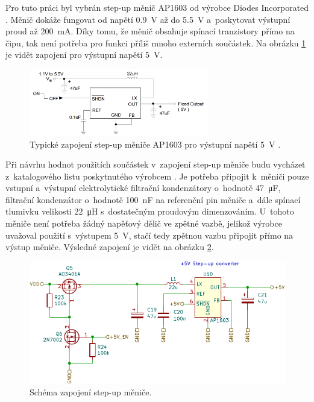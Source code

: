 Pro tuto práci byl vybrán step-up měnič AP1603 od výrobce Diodes Incorporated \cite{dat_AP1603}. Měnič dokáže fungovat od napětí \SI{0.9}{\volt} až do \SI{5.5}{\volt} a~poskytovat výstupní proud až \SI{200}{\milli\ampere}. Díky tomu, že měnič obsahuje spínací tranzistory přímo na čipu, tak není potřeba pro funkci příliš mnoho externích součástek. Na obrázku \ref{fig_schematic-AP1603} je vidět zapojení pro výstupní napětí \SI{5}{\volt}. 

\begin{figure}[h]
    \centering
    \includegraphics[width=0.7\textwidth]{obrazky/schematicAP1603.png}
    \caption{Typické zapojení step-up měniče AP1603 pro výstupní napětí \SI{5}{\volt} \cite{dat_AP1603}.}
    \label{fig_schematic-AP1603}
\end{figure}

Při návrhu hodnot použitích součástek v~zapojení step-up měniče budu vycházet z~katalogového listu poskytnutého výrobcem \cite{dat_AP1603}. Je potřeba připojit k~měniči pouze vstupní a~výstupní elektrolytické filtrační kondenzátory o~hodnotě \SI{47}{\micro\farad}, filtrační kondenzátor o~hodnotě \SI{100}{\nano\farad} na referenční pin měniče a~dále spínací tlumivku velikosti \SI{22}{\micro\henry} s~dostatečným proudovým dimenzováním. U~tohoto měniče není potřeba žádný napěťový dělič ve zpětné vazbě, jelikož výrobce uvažoval použití s~výstupem \SI{5}{\volt}, stačí tedy zpětnou vazbu připojit přímo na výstup měniče. Výsledné zapojení je vidět na obrázku \ref{fig_StepUp-kicad}.

\begin{figure}
    \centering
    \includegraphics[scale=1.2]{obrazky/stepup_schematic.pdf}
    \caption{Schéma zapojení step-up měniče.}
    \label{fig_StepUp-kicad}
\end{figure}


